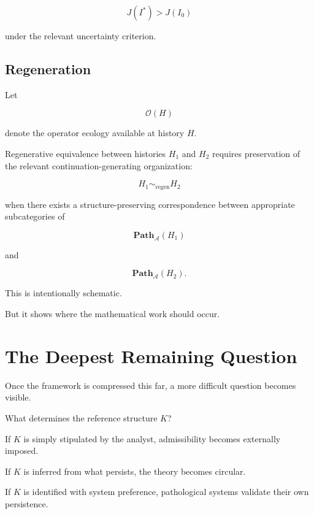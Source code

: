 \documentclass[11pt]{article}
\theoremstyle{remark}
\newcommand{\Adm}{\mathcal{A}}
\begin{document}
\begin{equation}
J(I^\ast)>J(I_0)
\end{equation}

under the relevant uncertainty criterion.

\subsection{Regeneration}

Let

\begin{equation}
\mathcal{O}(H)
\end{equation}

denote the operator ecology available at history $H$.

Regenerative equivalence between histories $H_1$ and $H_2$ requires preservation of the relevant continuation-generating organization:

\begin{equation}
H_1\sim_{\mathrm{regen}}H_2
\end{equation}

when there exists a structure-preserving correspondence between appropriate subcategories of

\begin{equation}
\mathbf{Path}_{\Adm}(H_1)
\end{equation}

and

\begin{equation}
\mathbf{Path}_{\Adm}(H_2).
\end{equation}

This is intentionally schematic.

But it shows where the mathematical work should occur.

\section{The Deepest Remaining Question}

Once the framework is compressed this far, a more difficult question becomes visible.

What determines the reference structure $K$?

If $K$ is simply stipulated by the analyst, admissibility becomes externally imposed.

If $K$ is inferred from what persists, the theory becomes circular.

If $K$ is identified with system preference, pathological systems validate their own persistence.
\end{document}

